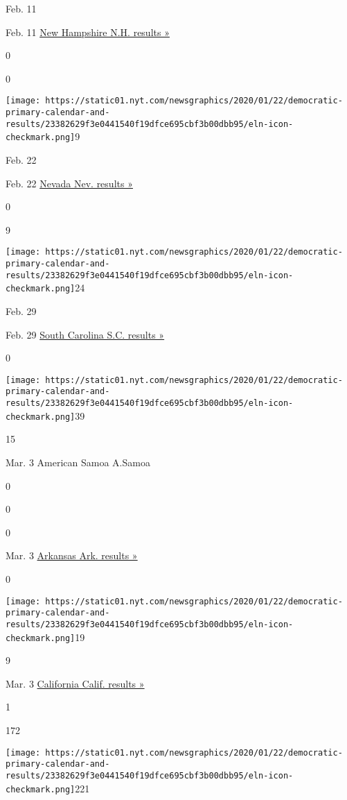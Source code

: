 Feb. 11

Feb. 11
\href{https://www.nytimes.com/interactive/2020/02/11/us/elections/results-new-hampshire-primary-election.html}{New
Hampshire N.H. results »}

0

0

\texttt{[image: https://static01.nyt.com/newsgraphics/2020/01/22/democratic-primary-calendar-and-results/23382629f3e0441540f19dfce695cbf3b00dbb95/eln-icon-checkmark.png]}9

Feb. 22

Feb. 22
\href{https://www.nytimes.com/interactive/2020/02/22/us/elections/results-nevada-caucus.html}{Nevada
Nev. results »}

0

9

\texttt{[image: https://static01.nyt.com/newsgraphics/2020/01/22/democratic-primary-calendar-and-results/23382629f3e0441540f19dfce695cbf3b00dbb95/eln-icon-checkmark.png]}24

Feb. 29

Feb. 29
\href{https://www.nytimes.com/interactive/2020/02/29/us/elections/results-south-carolina-primary-election.html}{South
Carolina S.C. results »}

0

\texttt{[image: https://static01.nyt.com/newsgraphics/2020/01/22/democratic-primary-calendar-and-results/23382629f3e0441540f19dfce695cbf3b00dbb95/eln-icon-checkmark.png]}39

15

Mar. 3 American Samoa A.Samoa

0

0

0

Mar. 3
\href{https://www.nytimes.com/interactive/2020/03/03/us/elections/results-arkansas-president-democrat-primary-election.html}{Arkansas
Ark. results »}

0

\texttt{[image: https://static01.nyt.com/newsgraphics/2020/01/22/democratic-primary-calendar-and-results/23382629f3e0441540f19dfce695cbf3b00dbb95/eln-icon-checkmark.png]}19

9

Mar. 3
\href{https://www.nytimes.com/interactive/2020/03/03/us/elections/results-california-president-democrat-primary-election.html}{California
Calif. results »}

1

172

\texttt{[image: https://static01.nyt.com/newsgraphics/2020/01/22/democratic-primary-calendar-and-results/23382629f3e0441540f19dfce695cbf3b00dbb95/eln-icon-checkmark.png]}221

